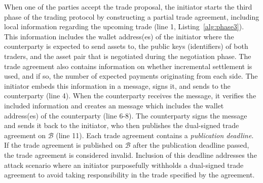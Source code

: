 When one of the parties accept the trade proposal, the initiator starts the third phase of the trading protocol by constructing a partial trade agreement, including local information regarding the upcoming trade (line 1, Listing~\ref{alg:phase3}).
This information includes the wallet address(es) of the initiator where the counterparty is expected to send assets to, the public keys (identifiers) of both traders, and the asset pair that is negotiated during the negotiation phase.
The trade agreement also contains information on whether incremental settlement is used, and if so, the number of expected payments originating from each side.
The initiator embeds this information in a \MsgPartialAgreement{} message, signs it, and sends to the counterparty (line 4).
When the counterparty receives the \MsgPartialAgreement{} message, it verifies the included information and creates an \MsgAgreement{} message which includes the wallet address(es) of the counterparty (line 6-8).
The counterparty signs the \MsgAgreement{} message and sends it back to the initiator, who then publishes the dual-signed trade agreement on $ \mathcal{B} $ (line 11).
Each trade agreement contains a \emph{publication deadline}.
If the trade agreement is published on $ \mathcal{B} $ after the publication deadline passed, the trade agreement is considered invalid.
Inclusion of this deadline addresses the attack scenario where an initiator purposefully withholds a dual-signed trade agreement to avoid taking responsibility in the trade specified by the agreement.


